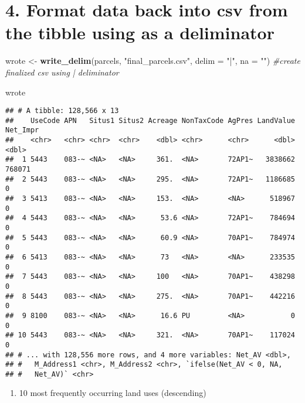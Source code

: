 \documentclass[]{article}
\newenvironment{Shaded}{\begin{snugshade}}{\end{snugshade}}
\newcommand{\KeywordTok}[1]{\textcolor[rgb]{0.13,0.29,0.53}{\textbf{#1}}}
\newcommand{\DataTypeTok}[1]{\textcolor[rgb]{0.13,0.29,0.53}{#1}}
\newcommand{\StringTok}[1]{\textcolor[rgb]{0.31,0.60,0.02}{#1}}
\newcommand{\CommentTok}[1]{\textcolor[rgb]{0.56,0.35,0.01}{\textit{#1}}}
\newcommand{\NormalTok}[1]{#1}
\providecommand{\tightlist}{%
  \setlength{\itemsep}{0pt}\setlength{\parskip}{0pt}}
\begin{document}
\section{4. Format data back into csv from the tibble using \textbar{}
as a
deliminator}\label{format-data-back-into-csv-from-the-tibble-using-as-a-deliminator}

\begin{Shaded}
\begin{Highlighting}[]
\NormalTok{wrote <-}\StringTok{ }\KeywordTok{write_delim}\NormalTok{(parcels,}
  \StringTok{"final_parcels.csv"}\NormalTok{,}
  \DataTypeTok{delim =} \StringTok{"|"}\NormalTok{,}
  \DataTypeTok{na =} \StringTok{""}\NormalTok{) }\CommentTok{#create finalized csv using | deliminator}

\NormalTok{wrote}
\end{Highlighting}
\end{Shaded}

\begin{verbatim}
## # A tibble: 128,566 x 13
##    UseCode APN   Situs1 Situs2 Acreage NonTaxCode AgPres LandValue Net_Impr
##    <chr>   <chr> <chr>  <chr>    <dbl> <chr>      <chr>      <dbl>    <dbl>
##  1 5443    083-~ <NA>   <NA>     361.  <NA>       72AP1~   3838662   768071
##  2 5443    083-~ <NA>   <NA>     295.  <NA>       72AP1~   1186685        0
##  3 5413    083-~ <NA>   <NA>     153.  <NA>       <NA>      518967        0
##  4 5443    083-~ <NA>   <NA>      53.6 <NA>       72AP1~    784694        0
##  5 5443    083-~ <NA>   <NA>      60.9 <NA>       70AP1~    784974        0
##  6 5413    083-~ <NA>   <NA>      73   <NA>       <NA>      233535        0
##  7 5443    083-~ <NA>   <NA>     100   <NA>       70AP1~    438298        0
##  8 5443    083-~ <NA>   <NA>     275.  <NA>       70AP1~    442216        0
##  9 8100    083-~ <NA>   <NA>      16.6 PU         <NA>           0        0
## 10 5443    083-~ <NA>   <NA>     321.  <NA>       70AP1~    117024        0
## # ... with 128,556 more rows, and 4 more variables: Net_AV <dbl>,
## #   M_Address1 <chr>, M_Address2 <chr>, `ifelse(Net_AV < 0, NA,
## #   Net_AV)` <chr>
\end{verbatim}

\begin{enumerate}
\def\labelenumi{\arabic{enumi}.}
\tightlist
\item
  10 most frequently occurring land uses (descending)
\end{enumerate}
\end{document}
